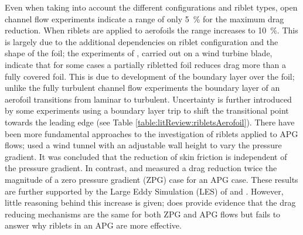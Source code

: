 \documentclass[12pt,oneside,a4paper]{article}
\begin{document}
%
 Even when taking into account the different configurations and riblet types, open channel flow experiments indicate a range of only \SI{5}{\%} for the maximum drag reduction. When riblets are applied to aerofoils the range increases to \SI{10}{\%}. This is largely due to the additional dependencies on riblet configuration and the shape of the foil; the experiments of \cite{chamorro2013}, carried out on a wind turbine blade, indicate that for some cases a partially ribletted foil reduces drag more than a fully covered foil. This is due to development of the boundary layer over the foil; unlike the fully turbulent channel flow experiments the boundary layer of an aerofoil transitions from laminar to turbulent. Uncertainty is further introduced by some experiments using a boundary layer trip to shift the transitional point towards the leading edge (see Table \ref{table:litReview:ribletsAerofoil}). There have been more fundamental approaches to the investigation of riblets applied to APG flows; \cite{choi1990} used a wind tunnel with an adjustable wall height to vary the pressure gradient. It was concluded that the reduction of skin friction is independent of the pressure gradient. In contrast, \cite{nieuwstadt1993} and \cite{debisschop1996} measured a drag reduction twice the magnitude of a zero pressure gradient (ZPG) case for an APG case. These results are further supported by the Large Eddy Simulation (LES) of \cite{klumpp2010} and \cite{boomsma2015}. However, little reasoning behind this increase is given; \cite{boomsma2015} does provide evidence that the drag reducing mechanisms are the same for both ZPG and APG flows but fails to answer why riblets in an APG are more effective.
\end{document}
